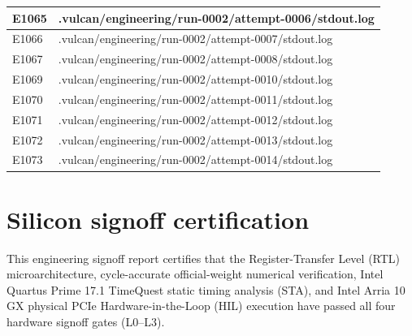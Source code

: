 \documentclass[11pt,a4paper]{article}
\begin{document}
{\begin{longtable}{@{}L{0.12\textwidth}|L{0.82\textwidth}@{}}
E1065 & .vulcan/\allowbreak{}engineering/\allowbreak{}run-0002/\allowbreak{}attempt-0006/\allowbreak{}stdout.log\\[2pt]\hline

E1066 & .vulcan/\allowbreak{}engineering/\allowbreak{}run-0002/\allowbreak{}attempt-0007/\allowbreak{}stdout.log\\[2pt]\hline

E1067 & .vulcan/\allowbreak{}engineering/\allowbreak{}run-0002/\allowbreak{}attempt-0008/\allowbreak{}stdout.log\\[2pt]\hline

E1069 & .vulcan/\allowbreak{}engineering/\allowbreak{}run-0002/\allowbreak{}attempt-0010/\allowbreak{}stdout.log\\[2pt]\hline

E1070 & .vulcan/\allowbreak{}engineering/\allowbreak{}run-0002/\allowbreak{}attempt-0011/\allowbreak{}stdout.log\\[2pt]\hline

E1071 & .vulcan/\allowbreak{}engineering/\allowbreak{}run-0002/\allowbreak{}attempt-0012/\allowbreak{}stdout.log\\[2pt]\hline

E1072 & .vulcan/\allowbreak{}engineering/\allowbreak{}run-0002/\allowbreak{}attempt-0013/\allowbreak{}stdout.log\\[2pt]\hline

E1073 & .vulcan/\allowbreak{}engineering/\allowbreak{}run-0002/\allowbreak{}attempt-0014/\allowbreak{}stdout.log\\[2pt]\hline

\bottomrule\end{longtable}}

\section{Silicon signoff certification}

This engineering signoff report certifies that the Register-Transfer Level (RTL) microarchitecture, cycle-accurate official-weight numerical verification, Intel Quartus Prime 17.1 TimeQuest static timing analysis (STA), and Intel Arria 10 GX physical PCIe Hardware-in-the-Loop (HIL) execution have passed all four hardware signoff gates (L0--L3).
\end{document}

